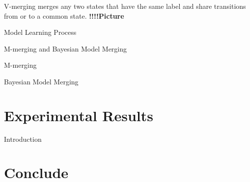 \documentclass{beamer}
\begin{document}
\begin{frame}{V-merging}
    merges any two states that have the same label and share transitions from or to a common state. 
    \textbf{!!!!Picture}
\end{frame}

\begin{frame}{Model Learning Process}
    \begin{enumerate}
        \item Assigning Each word its own state
        \item Neighbor-merging}}
        \item \textcolor{red} {Deep merging}
            \begin{itemize}
                \item V-merging
                \item \textcolor{red} {\textbf{M-merging}}
                \item \textcolor{red} {\textbf{Bayesian model merging}}
            \end{itemize}
    \end{enumerate}
\end{frame}

\begin{frame}{M-merging and Bayesian Model Merging}
\begin{block}{M-merging}
    
\end{block}

\begin{block}{Bayesian Model Merging}
    
\end{block}
\end{frame}



\section{Experimental Results}
\begin{frame}{Introduction}

\end{frame}

\section{Conclude}
\end{document}
